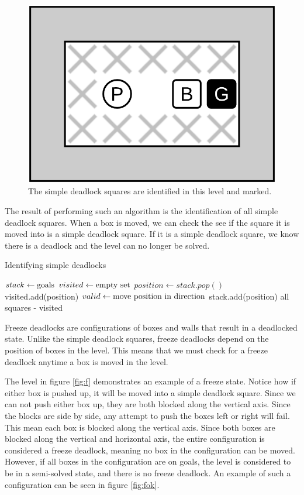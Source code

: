 \documentclass[times, 10pt,twocolumn]{article}
\begin{document}
\begin{figure}[h] 
  \centering
     \includegraphics[width=0.5\linewidth]{images/simple_deadlock.png}
  \caption{The simple deadlock squares are identified in this level and marked.}
  \label{fig:sd}
\end{figure}

The result of performing such an algorithm is the identification of all simple deadlock squares. When a box is moved, we can check the see if the square it is moved into is a simple deadlock square. If it is a simple deadlock square, we know there is a deadlock and the level can no longer be solved.

\begin{algorithm}
  \caption{Identifying simple deadlocks}
\begin{algorithmic}[1]
    \State $stack\gets \textnormal{goals}$
    \State $visited\gets \textnormal{empty set}$
      \State $position\gets stack.pop()$
      \State visited.add(position)
          \State $valid\gets \textnormal{move position in direction}$
          \State stack.add(position)
        \EndIf
      \EndFor
    \EndWhile
    \State \Return all squares - visited
  \EndFunction
  \end{algorithmic}
\end{algorithm}


Freeze deadlocks are configurations of boxes and walls that result in a deadlocked state. Unlike the simple deadlock squares, freeze deadlocks depend on the position of boxes in the level. This means that we must check for a freeze deadlock anytime a box is moved in the level. 

The level in figure \ref{fig:f} demonstrates an example of a freeze state. Notice how if either box is pushed up, it will be moved into a simple deadlock square. Since we can not push either box up, they are both blocked along the vertical axis. Since the blocks are side by side, any attempt to push the boxes left or right will fail. This mean each box is blocked along the vertical axis. Since both boxes are blocked along the vertical and horizontal axis, the entire configuration is considered a freeze deadlock, meaning no box in the configuration can be moved. However, if all boxes in the configuration are on goals, the level is considered to be in a semi-solved state, and there is no freeze deadlock. An example of such a configuration can be seen in figure \ref{fig:fok}.
\end{document}
